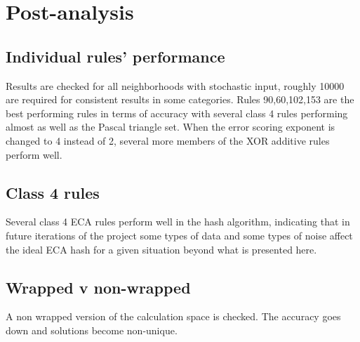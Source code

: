 \documentclass[11pt]{article}
\begin{document}
\section{Post-analysis}


\subsection{Individual rules' performance}
Results are checked for all neighborhoods with stochastic input, roughly 10000 are
required for consistent results in some categories. Rules 90,60,102,153 are the best
performing rules in terms of accuracy with several class 4 rules performing almost as
well as the Pascal triangle set. When the error scoring exponent is changed to 4
instead of 2, several more members of the XOR additive rules perform well.
\\
\subsection{Class 4 rules}
Several class 4 ECA rules perform well in the hash algorithm, indicating that in
future iterations of the project some types of data and some types of noise
affect the ideal ECA hash for a given situation beyond what is presented here.
\\
\subsection{Wrapped v non-wrapped}
A non wrapped version of the calculation space is checked. The accuracy goes down and solutions become non-unique.
\\


\end{document}
